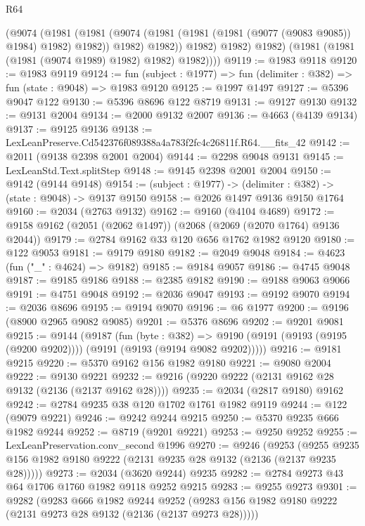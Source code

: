 \begin{lexlean}{R64}
\begin{coremodule}
                (@9074
                  (@1981
                    (@1981
                      (@9074 (@1981 (@1981 (@1981 (@9077 (@9083 @9085)) @1984) @1982) @1982))
                      @1982)
                    @1982))
                @1982)
              @1982)
            @1982)
          (@1981 (@1981 (@1981 (@9074 @1989) @1982) @1982) @1982))))
@9119 := @1983 @9118
@9120 := @1983 @9119
@9124 := fun (subject : @1977) => fun (delimiter : @382) => fun (state : @9048) => @1983 @9120
@9125 := @1997 @1497
@9127 := @5396 @9047 @122
@9130 := @5396 @8696 @122 @8719
@9131 := @9127 @9130
@9132 := @9131 @2004
@9134 := @2000 @9132 @2007
@9136 := @4663 (@4139 @9134)
@9137 := @9125 @9136
@9138 := LexLeanPreserve.Cd542376f089388a4a783f2fc4c26811f.R64.__fits_42
@9142 := @2011 (@9138 @2398 @2001 @2004)
@9144 := @2298 @9048 @9131
@9145 := LexLeanStd.Text.splitStep
@9148 := @9145 @2398 @2001 @2004
@9150 := @9142 (@9144 @9148)
@9154 := (subject : @1977) -> (delimiter : @382) -> (state : @9048) -> @9137 @9150
@9158 := @2026 @1497 @9136 @9150 @1764
@9160 := @2034 (@2763 @9132)
@9162 := @9160 (@4104 @4689)
@9172 := @9158 @9162 (@2051 (@2062 @1497)) (@2068 (@2069 (@2070 @1764) @9136 @2044))
@9179 := @2784 @9162 @33 @120 @656 @1762 @1982 @9120
@9180 := @122 @9053
@9181 := @9179 @9180
@9182 := @2049 @9048
@9184 := @4623 (fun ("_" : @4624) => @9182)
@9185 := @9184 @9057
@9186 := @4745 @9048
@9187 := @9185 @9186
@9188 := @2385 @9182
@9190 := @9188 @9063 @9066
@9191 := @4751 @9048
@9192 := @2036 @9047
@9193 := @9192 @9070
@9194 := @2036 @8696
@9195 := @9194 @9070
@9196 := @6 @1977
@9200 := @9196 (@8900 @2965 @9082 @9085)
@9201 := @5376 @8696
@9202 := @9201 @9081
@9215 := @9144
    (@9187
      (fun (byte : @382) =>
      @9190 (@9191 (@9193 (@9195 (@9200 @9202)))) (@9191 (@9193 (@9194 @9082 @9202)))))
@9216 := @9181 @9215
@9220 := @5370 @9162 @156 @1982 @9180
@9221 := @9080 @2004
@9222 := @9130 @9221
@9232 := @9216 (@9220 @9222 (@2131 @9162 @28 @9132 (@2136 (@2137 @9162 @28))))
@9235 := @2034 (@2817 @9180) @9162
@9242 := @2784 @9235 @38 @120 @1702 @1761 @1982 @9119
@9244 := @122 (@9079 @9221)
@9246 := @9242 @9244 @9215
@9250 := @5370 @9235 @666 @1982 @9244
@9252 := @8719 (@9201 @9221)
@9253 := @9250 @9252
@9255 := LexLeanPreservation.conv_second @1996
@9270 := @9246
    (@9253 (@9255 @9235 @156 @1982 @9180 @9222 (@2131 @9235 @28 @9132 (@2136 (@2137 @9235 @28)))))
@9273 := @2034 (@3620 @9244) @9235
@9282 := @2784 @9273 @43 @64 @1706 @1760 @1982 @9118 @9252 @9215
@9283 := @9255 @9273
@9301 := @9282
    (@9283
      @666
      @1982
      @9244
      @9252
      (@9283 @156 @1982 @9180 @9222 (@2131 @9273 @28 @9132 (@2136 (@2137 @9273 @28)))))

\end{coremodule}
\end{lexlean}
